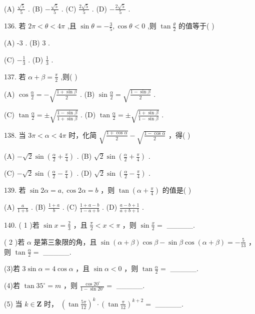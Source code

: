 \documentclass[10pt]{article}
\begin{document}
(A) \(\frac{\sqrt{5}}{5}\) . (B) \(- \frac{\sqrt{5}}{5}\) . (C) \(\frac{2\sqrt{5}}{5}\) . (D) \(- \frac{2\sqrt{5}}{5}\) .

136. 若 \({2\pi } < \theta  < {4\pi }\) ,且 \(\sin \theta  =  - \frac{3}{5},\cos \theta  < 0\) ,则 \(\tan \frac{\theta }{2}\) 的值等于( )

(A) -3 . (B) 3 .

(C) \(- \frac{1}{3}\) . (D) \(\frac{1}{3}\) .

137. 若 \(\alpha  + \beta  = \frac{\pi }{2}\) ,则(   )

(A) \(\cos \frac{\alpha }{2} =  - \sqrt{\frac{1 + \sin \beta }{2}}\) . (B) \(\sin \frac{\alpha }{2} = \sqrt{\frac{1 - \sin \beta }{2}}\) .

(C) \(\tan \frac{\alpha }{2} =  \pm  \sqrt{\frac{1 - \sin \beta }{1 + \sin \beta }}\) . (D) \(\tan \frac{\alpha }{2} =  \pm  \sqrt{\frac{1 + \sin \beta }{1 - \sin \beta }}\) .

138. 当 \({3\pi } < \alpha  < {4\pi }\) 时，化简 \(\sqrt{\frac{1 + \cos \alpha }{2}} - \sqrt{\frac{1 - \cos \alpha }{2}}\) ，得( )

(A) \(- \sqrt{2}\sin \left( {\frac{\alpha }{2} + \frac{\pi }{4}}\right)\) . (B) \(\sqrt{2}\sin \left( {\frac{\alpha }{2} + \frac{\pi }{4}}\right)\) .

(C) \(- \sqrt{2}\sin \left( {\frac{\alpha }{2} - \frac{\pi }{4}}\right)\) . (D) \(\sqrt{2}\sin \left( {\frac{\alpha }{2} - \frac{\pi }{4}}\right)\) .

139. 若 \(\sin {2\alpha } = a,\cos {2\alpha } = b\) ，则 \(\tan \left( {\alpha  + \frac{\pi }{4}}\right)\) 的值是( )

(A) \(\frac{a}{1 + b}\) . (B) \(\frac{1 + a}{b}\) . (C) \(\frac{1 + a - b}{1 - a + b}\) . (D) \(\frac{a - b + 1}{a + b + 1}\) .

140. ( 1 )若 \(\sin x = \frac{2}{3}\) ，且 \(\frac{\pi }{2} < x < \pi\) ，则 \(\sin \frac{x}{2} =\) \_\_\_\_\_.

( 2 )若 \(\alpha\) 是第三象限的角，且 \(\sin \left( {\alpha  + \beta }\right) \cos \beta  - \sin \beta \cos \left( {\alpha  + \beta }\right)  =  - \frac{5}{13}\) ，则 \(\tan \frac{\alpha }{2} =\) \_\_\_\_\_.

(3)若 \(3\sin \alpha  = 4\cos \alpha\) ，且 \(\sin \alpha  < 0\) ，则 \(\tan \frac{\alpha }{2} =\) \_\_\_\_\_.

(4)若 \(\tan {35}^{ \circ  } = m\) ，则 \(\frac{\cos {20}^{ \circ  }}{1 - \sin {20}^{ \circ  }} =\) \_\_\_\_\_.

(5) 当 \(k \in  \mathbf{Z}\) 时， \({\left( \tan \frac{5\pi }{12}\right) }^{k} \cdot  {\left( \tan \frac{\pi }{12}\right) }^{k + 2} =\) \_\_\_\_\_.
\end{document}
